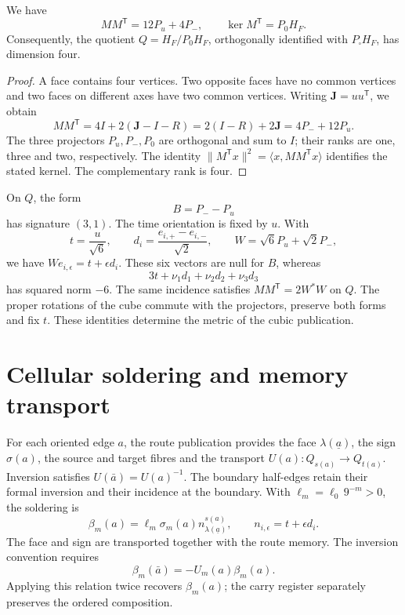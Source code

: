 \begin{proposition}
\label{x_reciprocidad:vii:prop:incidencia}
We have
\[
 MM^{\mathsf T}=12P_u+4P_-,
 \qquad
 \ker M^{\mathsf T}=P_0H_F.
\]
Consequently, the quotient
\(Q=H_F/P_0H_F\), orthogonally identified with
\(P_\square H_F\), has dimension four.
\end{proposition}

\begin{proof}
A face contains four vertices. Two opposite faces have no common
vertices and two faces on different axes have two common vertices.
Writing \(\mathbf J=uu^{\mathsf T}\), we obtain
\[
 MM^{\mathsf T}=4I+2(\mathbf J-I-R)
 =2(I-R)+2\mathbf J=4P_-+12P_u.
\]
The three projectors \(P_u,P_-,P_0\) are orthogonal and sum to \(I\);
their ranks are one, three and two, respectively. The identity
\(\|M^{\mathsf T}x\|^2=\langle x,MM^{\mathsf T}x\rangle\)
identifies the stated kernel. The complementary rank is four.
\end{proof}

On \(Q\), the form
\[
 B=P_--P_u
\]
has signature \((3,1)\). The time orientation is fixed by \(u\).
With
\[
 t=\frac{u}{\sqrt6},\qquad
 d_i=\frac{e_{i,+}-e_{i,-}}{\sqrt2},\qquad
 W=\sqrt6P_u+\sqrt2P_-,
\]
we have \(We_{i,\epsilon}=t+\epsilon d_i\). These six vectors
are null for \(B\), whereas
\[
 3t+\nu_1d_1+\nu_2d_2+\nu_3d_3
\]
has squared norm \(-6\). The same incidence satisfies
\(MM^{\mathsf T}=2W^*W\) on \(Q\). The proper rotations of the cube
commute with the projectors, preserve both forms and fix \(t\).
These identities determine the metric of the cubic publication.

\section{Cellular soldering and memory transport}
\label{x_reciprocidad:vii:sec:soldadura-celular}

For each oriented edge \(a\), the route publication provides
the face \(\lambda(\underline a)\), the sign
\(\sigma(a)\), the source and target fibres and the transport
\(U(a):Q_{s(a)}\longrightarrow Q_{t(a)}\).
Inversion satisfies \(U(\bar a)=U(a)^{-1}\).
The boundary half-edges retain their formal inversion and their incidence
at the boundary. With \(\ell_m=\ell_0\,9^{-m}>0\), the soldering is
\begin{equation}
 \beta_m(a)=\ell_m\sigma_m(a)
              n_{\lambda(\underline a)}^{s(a)},\qquad
 n_{i,\epsilon}=t+\epsilon d_i.
 \label{x_reciprocidad:vii:eq:soldadura-arista}
\end{equation}
The face and sign are transported together with the route memory.
The inversion convention requires
\begin{equation}
 \beta_m(\bar a)=-U_m(a)\beta_m(a).
 \label{x_reciprocidad:vii:eq:inversion-soldadura}
\end{equation}
Applying this relation twice recovers \(\beta_m(a)\);
the carry register separately preserves the ordered composition.

